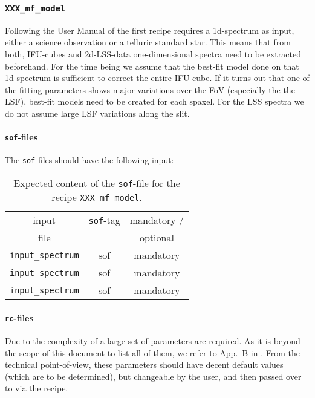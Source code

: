 \subsubsection{\texttt{XXX\_mf\_model}}
Following the User Manual of \mf\cite{molecfit} the first recipe requires a 1d-spectrum as input, either a science observation or a telluric standard star. This means that from both, \ac{IFU}-cubes and 2d-\ac{LSS}-data one-dimensional spectra need to be extracted beforehand. For the time being we assume that the best-fit model done on that 1d-spectrum is sufficient to correct the entire \ac{IFU} cube. If it turns out that one of the fitting parameters shows major variations over the \ac{FoV} (especially the the \ac{LSF}), best-fit models need to be created for each spaxel. For the \ac{LSS} spectra we do not assume large \ac{LSF} variations along the slit. \\
\paragraph{\texttt{sof}-files}\label{app:mf_model_sof}
The \texttt{sof}-files should have the following input:\\

\begin{table}[h!]
\centering
\begin{tabular}{|c : c : c|} 
 \hline
 input & \texttt{sof}-tag & mandatory / \\ 
 file &  & optional \\ 
 \hline
 \texttt{input\_spectrum} & sof & mandatory  \\ 
 \texttt{input\_spectrum} & sof & mandatory  \\ 
 \hdashline
 \texttt{input\_spectrum} & sof & mandatory  \\ 
 \hline
\end{tabular}
\caption{Expected content of the \texttt{sof}-file for the recipe \texttt{XXX\_mf\_model}\label{tab:sof_mf_model}.}
\label{table:1}
\end{table}
\paragraph{\texttt{rc}-files}\label{app:mf_model_rc}
Due to the complexity of \mf a large set of parameters are required. As it is beyond the scope of this document to list all of them, we refer to App.~B in \cite{molecfit}. From the technical point-of-view, these parameters should have decent default values (which are to be determined), but changeable by the user, and then passed over to \mf  via the recipe. 

